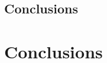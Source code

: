 \documentclass[a4,12pt]{ozu-thesis}
\begin{document}
\section{Conclusions}


\chapter{Conclusions}



\begin{thebibliography}{99}


\end{thebibliography}


\appendix



\begin{postliminary}
\end{postliminary}
\end{document}
